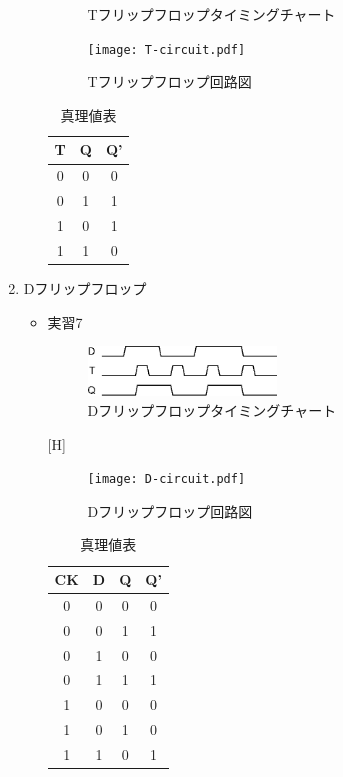 \documentclass[dvipdfmx, a4paper]{jsarticle}
\begin{document}
\begin{enumerate}
\begin{itemize}
\begin{figure}[H]
							\caption{Tフリップフロップタイミングチャート}
						\end{figure}
						\begin{figure}
							\center
							\texttt{[image: T-circuit.pdf]}
							\caption{Tフリップフロップ回路図}
						\end{figure}
						\begin{table}[H]
							\center
							\caption{真理値表}
							\begin{tabular}{|c|c|c|}
								\hline
								T & Q & Q' \\ \hline
								0 & 0 & 0 \\ \hline
								0 & 1 & 1 \\ \hline
								1 & 0 & 1 \\ \hline
								1 & 1 & 0 \\ \hline
							\end{tabular}
						\end{table}
				\end{itemize}
			\item Dフリップフロップ
				\begin{itemize}
					\item 実習7
						\begin{figure}[H]
							\center
							\includegraphics[width=5cm]{d.eps}
							\caption{Dフリップフロップタイミングチャート}
						\end{figure}[H]
						\begin{figure}[H]
							\center
							\texttt{[image: D-circuit.pdf]}
							\caption{Dフリップフロップ回路図}
						\end{figure}
						\begin{table}[H]
							\center
							\caption{真理値表}
							\begin{tabular}{|c|c|c|c|}
								\hline
								CK & D & Q & Q' \\ \hline
								0 & 0 & 0 & 0 \\ \hline
								0 & 0 & 1 & 1 \\ \hline
								0 & 1 & 0 & 0 \\ \hline
								0 & 1 & 1 & 1 \\ \hline
								1 & 0 & 0 & 0 \\ \hline
								1 & 0 & 1 & 0 \\ \hline
								1 & 1 & 0 & 1 \\ \hline

\end{tabular}
\end{table}
\end{itemize}
\end{enumerate}
\end{document}
